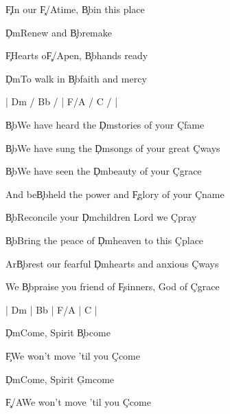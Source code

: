 \documentclass[9pt]{extarticle}
\begin{document}
\bsong

\bc
\c{F}In our \c{F/A}time, \c{Bb}in this place

\c{Dm}Renew and \c{Bb}remake

\c{F}Hearts o\c{F/A}pen, \c{Bb}hands ready

\c{Dm}To walk in \c{Bb}faith and mercy
\ec

\bin
|  Dm / Bb /  |  F/A / C /  |
\ein

\bv
\c{Bb}We have heard the \c{Dm}stories of your \c{C}fame

\c{Bb}We have sung the \c{Dm}songs of your great \c{C}ways

\c{Bb}We have seen the \c{Dm}beauty of your \c{C}grace

And be\c{Bb}held the power and \c{F}glory of your \c{C}name
\ev



\bv
\c{Bb}Reconcile your \c{Dm}children Lord we \c{C}pray

\c{Bb}Bring the peace of \c{Dm}heaven to this \c{C}place

Ar\c{Bb}rest our fearful \c{Dm}hearts and anxious \c{C}ways

We \c{Bb}praise you friend of \c{F}sinners, God of \c{C}grace
\ev


\bin
| Dm | Bb |  F/A  | C |
\ein

\bb[3]
\c{Dm}Come, Spirit \c{Bb}come

\c{F}We won't move 'til you \c{C}come
\eb

\bb
\c{Dm}Come, Spirit \c{Gm}come

\c{F/A}We won't move 'til you \c{C}come
\eb


\esong
\end{document}
